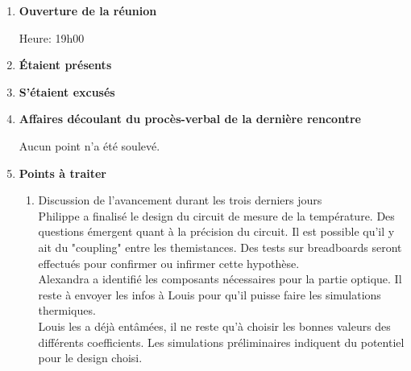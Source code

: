 \documentclass[12pt]{ULojpv}
\begin{document}
\entete
\begin{enumerate}

\item \textbf{Ouverture de la réunion}

Heure: 19h00

\item \textbf{Étaient présents}


\item \textbf{S'étaient excusés}

\item \textbf{Affaires découlant du procès-verbal de la dernière rencontre}

Aucun point n'a été soulevé.


\item \textbf{Points à traiter}
   \begin{enumerate}
      \item Discussion de l'avancement durant les trois derniers jours\\
      Philippe a finalisé le design du circuit de mesure de la température. Des questions
      émergent quant à la précision du circuit. Il est possible qu'il y ait du "coupling" entre 
      les themistances. Des tests sur breadboards seront effectués pour confirmer ou infirmer cette 
      hypothèse.\\

      Alexandra a identifié les composants nécessaires pour la partie optique. Il reste à
      envoyer les infos à Louis pour qu'il puisse faire les simulations thermiques. \\
      
      Louis les a déjà entâmées, il ne reste qu'à choisir les bonnes valeurs des différents coefficients.
      Les simulations préliminaires indiquent du potentiel pour le design choisi.\\


\end{enumerate}
\end{enumerate}
\end{document}
